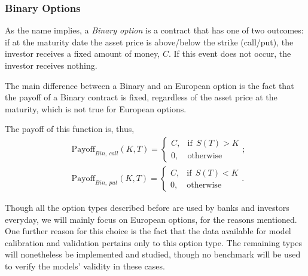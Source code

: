    
   
\subsubsection{Binary Options}
As the name implies, a \emph{Binary option} is a contract that has one of two outcomes: if at the maturity date the asset price is above/below the strike (call/put), the investor receives a fixed amount of money, $C$. If this event does not occur, the investor receives nothing.

The main difference between a Binary and an European option is the fact that the payoff of a Binary contract is fixed, regardless of the asset price at the maturity, which is not true for European options.

The payoff of this function is, thus,
\begin{equation}\label{binary}
\begin{split}
&\text{Payoff}_{Bin,\ call}(K,T)=\begin{cases} 
      C, & \mathrm{if}\ \ S(T)>K\\
      0, & \mathrm{otherwise}
   \end{cases};\\
&\text{Payoff}_{Bin,\ put}(K,T)=\begin{cases} 
      C, & \mathrm{if}\ \ S(T)<K\\
      0, & \mathrm{otherwise}
   \end{cases}.
\end{split}
\end{equation}


Though all the option types described before are used by banks and investors everyday, we will mainly focus on European options, for the reasons mentioned. One further reason for this choice is the fact that the data available for model calibration and validation pertains only to this option type.
The remaining types will nonetheless be implemented and studied, though no benchmark will be used to verify the models' validity in these cases.


